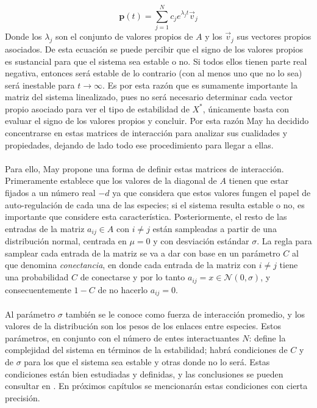 $$\textbf{p}(t)=\sum_{j=1}^N c_{j}e^{\lambda_{j}t}\vec{v}_j$$
Donde los $\lambda_{j}$ son el conjunto de valores propios de $A$ y los $\vec{v}_j$ sus vectores propios asociados. De esta ecuación se puede percibir que el signo de los valores propios es sustancial para que el sistema sea estable o no. Si todos ellos tienen parte real negativa, entonces será estable de lo contrario (con al menos uno que no lo sea) será inestable para $t\to\infty$. Es por esta razón que es sumamente importante la matriz del sistema linealizado, pues no será necesario determinar cada vector propio asociado para ver el tipo de estabilidad de $X^*$, únicamente basta con evaluar el signo de los valores propios y concluir. Por esta razón May ha decidido concentrarse en estas matrices de interacción para analizar sus cualidades y propiedades, dejando de lado todo ese procedimiento para llegar a ellas.
\\
\\
\setlength{\parindent}{0cm} Para ello, May propone una forma de definir estas matrices de interacción. Primeramente establece que los valores de la diagonal de $A$ tienen que estar fijados a un número real $-d$ ya que considera que estos valores fungen el papel de auto-regulación de cada una de las especies; si el sistema resulta estable o no, es importante que considere esta característica. Posteriormente, el resto de las entradas de la matriz $a_{ij}\in A$ con $i\neq j$ están sampleadas a partir de una distribución normal, centrada en $\mu=0$ y con desviación estándar $\sigma$. La regla para samplear cada entrada de la matriz se va a dar con base en un parámetro $C $ al que denomina \textit{conectancia}, en donde cada entrada de la matriz con $i\neq j$ tiene una probabilidad $C$ de conectarse y por lo tanto $a_{ij}=x\in\mathcal{N}(0,\sigma)$, y consecuentemente $1-C$ de no hacerlo $ a_{ij}=0$.\\
\\
Al parámetro $\sigma$ también se le conoce como fuerza de interacción promedio, y los valores de la distribución son los pesos de los enlaces entre especies. Estos parámetros, en conjunto con el número de entes interactuantes $N$: define la complejidad del sistema en términos de la estabilidad; habrá condiciones de $C$ y de $\sigma$ para los que el sistema sea estable y otras donde no lo será. Estas condiciones están bien estudiadas y definidas, y las conclusiones se pueden consultar en \cite{may1972will}. En próximos capítulos se mencionarán estas condiciones con cierta precisión. 
\\
